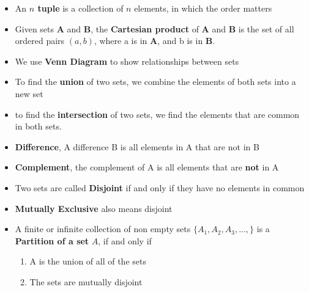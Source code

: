 \documentclass{report}
\begin{document}
\begin{itemize}
        \item An \textbf{$n$ tuple} is a collection of $n $ elements, in which the order matters
        \item Given sets \textbf{A} and \textbf{B}, the \textbf{Cartesian product} of \textbf{A} and \textbf{B} is the set of all ordered pairs $(a,b)$, where a is in \textbf{A}, and b is in \textbf{B}.
        \item We use \textbf{Venn Diagram} to show relationships between sets
        \item  To find the \textbf{union} of two sets, we combine the elements of both sets into a new set
        \item  to find the \textbf{intersection} of two sets, we find the elements that are common in both sets.
        \item \textbf{Difference}, A difference B is all elements in A that are not in B
        \item \textbf{Complement}, the complement of A is all elements that are \textbf{not} in A
        \item Two sets are called \textbf{Disjoint} if and only if they have no elements in common
        \item \textbf{Mutually Exclusive} also means disjoint
        \item A finite or infinite collection of non empty sets $\{A_{1}, A_{2}, A_{3}, ..., \} $ is a \textbf{Partition of a set} $A $, if and only if 
        \begin{enumerate}
            \item A is the union of all of the sets
            \item The sets are mutually disjoint
        \end{enumerate}
      \end{itemize}

      \pagebreak \bigbreak \noindent 
\end{document}
